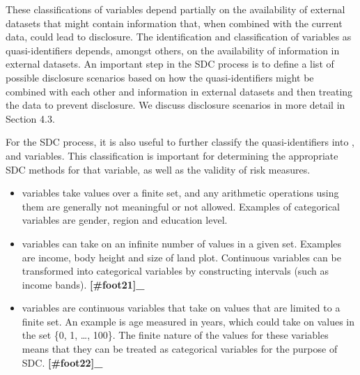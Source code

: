 \documentclass[letterpaper,10pt,english]{sphinxmanual}
\begin{document}
\begin{itemize}
These classifications of variables depend partially on the
availability of external datasets that might contain information
that, when combined with the current data, could lead to disclosure.
The identification and classification of variables as
quasi-identifiers depends, amongst others, on the availability of
information in external datasets. An important step in the SDC
process is to define a list of possible disclosure scenarios based on
how the quasi-identifiers might be combined with each other and
information in external datasets and then treating the data to
prevent disclosure. We discuss disclosure scenarios in more detail in
Section 4.3.

\end{itemize}

For the SDC process, it is also useful to further classify the
quasi-identifiers into ,  and
 variables. This classification is important for
determining the appropriate SDC methods for that variable, as well as
the validity of risk measures.
\begin{itemize}
\item {} 
 variables take values over a finite set, and any
arithmetic operations using them are generally not meaningful or not
allowed. Examples of categorical variables are gender, region and
education level.

\item {} 
 variables can take on an infinite number of values in
a given set. Examples are income, body height and size of land plot.
Continuous variables can be transformed into categorical variables by
constructing intervals (such as income bands). {\color{red}\bfseries{}{[}\#foot21{]}\_}

\item {} 
 variables are continuous variables that take on
values that are limited to a finite set. An example is age measured
in years, which could take on values in the set \{0, 1, …, 100\}. The
finite nature of the values for these variables means that they can
be treated as categorical variables for the purpose of
SDC. {\color{red}\bfseries{}{[}\#foot22{]}\_}

\end{itemize}
\end{document}
